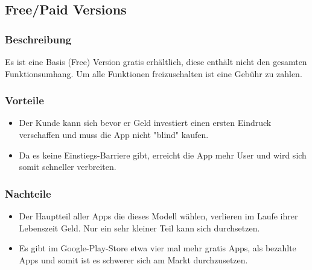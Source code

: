 \documentclass[FIPLY_base.tex]{subfiles}
\author{Gerald Irsiegler}
\date{25. Februar 2016}
\begin{document}
\subsection{Free/Paid Versions}


\subsubsection{Beschreibung}
Es ist eine Basis (Free) Version gratis erhältlich, diese enthält nicht den gesamten Funktionsumhang.
Um alle Funktionen freizuschalten ist eine Gebühr zu zahlen.

\subsubsection{Vorteile}
\begin{itemize}
\item Der Kunde kann sich bevor er Geld investiert einen ersten Eindruck verschaffen und muss die App nicht "blind" kaufen.
\item Da es keine Einstiegs-Barriere gibt, erreicht die App mehr User und wird sich somit schneller verbreiten.
\end{itemize}

\subsubsection{Nachteile}
\begin{itemize}
\item Der Hauptteil aller Apps die dieses Modell wählen, verlieren im Laufe ihrer Lebenszeit Geld. Nur ein sehr kleiner Teil kann sich durchsetzen.
\item Es gibt im Google-Play-Store etwa vier mal mehr gratis Apps, als bezahlte Apps und somit ist es schwerer sich am Markt durchzusetzen.
\end{itemize}
\end{document}
